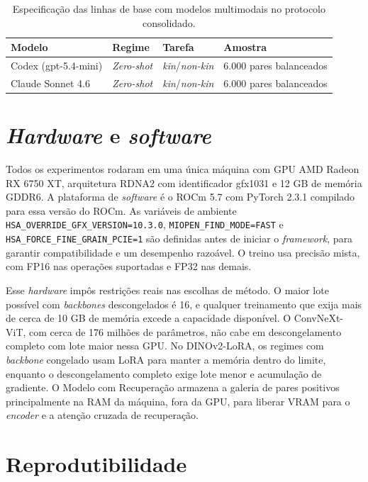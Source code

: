 \begin{table}[h]
\centering
\caption{Especificação das linhas de base com modelos multimodais no protocolo consolidado.}
\label{tab:vlms_metodologia}
\begin{tabularx}{\textwidth}{l l l X}
\hline
\textbf{Modelo} & \textbf{Regime} & \textbf{Tarefa} & \textbf{Amostra} \\
\hline
Codex (gpt-5.4-mini) & \textit{Zero-shot} & \textit{kin}/\textit{non-kin} & 6.000 pares balanceados \\
Claude Sonnet 4.6 & \textit{Zero-shot} & \textit{kin}/\textit{non-kin} & 6.000 pares balanceados \\
\hline
\end{tabularx}
\end{table}

\section{\textit{Hardware} e \textit{software}}

Todos os experimentos rodaram em uma única máquina com GPU AMD Radeon RX 6750 XT, arquitetura RDNA2 com identificador gfx1031 e 12 GB de memória GDDR6. A plataforma de \textit{software} é o ROCm 5.7 com PyTorch 2.3.1 compilado para essa versão do ROCm. As variáveis de ambiente \texttt{HSA\_OVERRIDE\_GFX\_VERSION=10.3.0}, \texttt{MIOPEN\_FIND\_MODE=FAST} e \texttt{HSA\_FORCE\_FINE\_GRAIN\_PCIE=1} são definidas antes de iniciar o \textit{framework}, para garantir compatibilidade e um desempenho razoável. O treino usa precisão mista, com FP16 nas operações suportadas e FP32 nas demais.

Esse \textit{hardware} impôs restrições reais nas escolhas de método. O maior lote possível com \textit{backbones} descongelados é 16, e qualquer treinamento que exija mais de cerca de 10 GB de memória excede a capacidade disponível. O ConvNeXt-ViT, com cerca de 176 milhões de parâmetros, não cabe em descongelamento completo com lote maior nessa GPU. No DINOv2-LoRA, os regimes com \textit{backbone} congelado usam LoRA para manter a memória dentro do limite, enquanto o descongelamento completo exige lote menor e acumulação de gradiente. O Modelo com Recuperação armazena a galeria de pares positivos principalmente na RAM da máquina, fora da GPU, para liberar VRAM para o \textit{encoder} e a atenção cruzada de recuperação.

\section{Reprodutibilidade}

